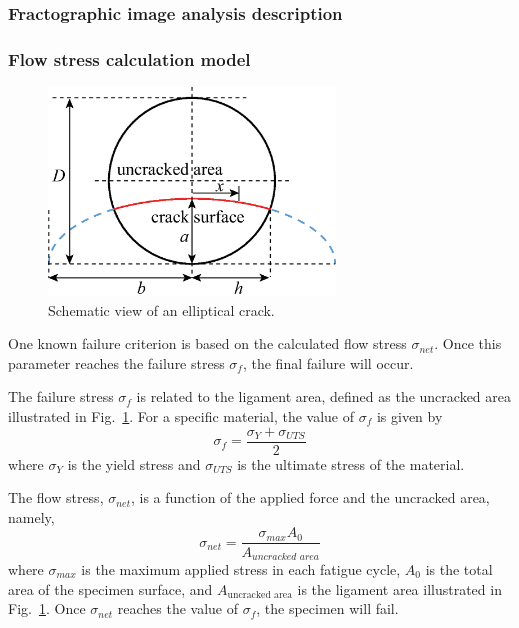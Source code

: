 \documentclass[preprint,12pt]{elsarticle}
\begin{document}
\subsubsection{Fractographic image analysis description}
\label{Subsec: Fractographic image analysis}

\subsubsection{Flow stress calculation model}
\label{Subsec: Flow stress calculation model}
\begin{figure}[t!]
  \begin{center}
  \includegraphics[width=3in]{elliptical_surface_crack.eps}
  \caption{Schematic view of an elliptical crack.}
  \label{fig:elliptical_crack}
   \end{center}
\end{figure}

One known failure criterion is based on the calculated flow stress $\sigma_{net}$. Once this parameter reaches the failure stress $\sigma_{f}$, the final failure will occur.

The failure stress \(\sigma_{f}\) is related to the ligament area, defined as the uncracked area illustrated in Fig.~\ref{fig:elliptical_crack}. For a specific material, the value of \(\sigma_{f}\) is given by \cite{kanchanomai2004low}
%
\begin{equation}
    \sigma_{f} = \frac{\sigma_Y + \sigma_{UTS}}{2}
\end{equation}
%
where \(\sigma_Y\) is the yield stress and \(\sigma_{UTS}\) is the ultimate stress of the material.

The flow stress, \(\sigma_{net}\), is a function of the applied force and the uncracked area, namely,
%
\begin{equation}
\label{eq:sig_net}
\sigma_{net}= \displaystyle\frac{\sigma_{max} A_0}{A_{\textit{uncracked area}}}
\end{equation}
%
where $\sigma_{max}$ is the maximum applied stress in each fatigue cycle, \(A_0\) is the total area of the specimen surface, and \(A_{\text{uncracked area}}\) is the ligament area illustrated in Fig.~\ref{fig:elliptical_crack}. Once \(\sigma_{net}\) reaches the value of \(\sigma_f\), the specimen will fail.
%
%
\end{document}
